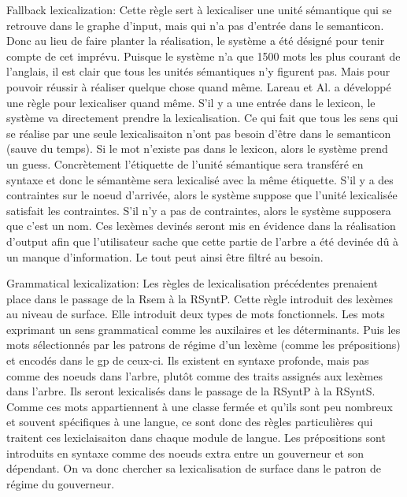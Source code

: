 Fallback lexicalization: Cette règle sert à lexicaliser une unité sémantique qui se retrouve dans le graphe d'input, mais qui n'a pas d'entrée dans le semanticon. Donc au lieu de faire planter la réalisation, le système a été désigné pour tenir compte de cet imprévu. Puisque le système n'a que 1500 mots les plus courant de l'anglais, il est clair que tous les unités sémantiques n'y figurent pas. Mais pour pouvoir réussir à réaliser quelque chose quand même. Lareau et Al. a développé une règle pour lexicaliser quand même. S'il y a une entrée dans le lexicon, le système va directement prendre la lexicalisation. Ce qui fait que tous les sens qui se réalise par une seule lexicalisaiton n'ont pas besoin d'être dans le semanticon (sauve du temps). Si le mot n'existe pas dans le lexicon, alors le système prend un guess. Concrètement l'étiquette de l'unité sémantique sera transféré en syntaxe et donc le sémantème sera lexicalisé avec la même étiquette. S'il y a des contraintes sur le noeud d'arrivée, alors le système suppose que l'unité lexicalisée satisfait les contraintes. S'il n'y a pas de contraintes, alors le système supposera que c'est un nom. Ces lexèmes devinés seront mis en évidence dans la réalisation d'output afin que l'utilisateur sache que cette partie de l'arbre a été devinée dû à un manque d'information. Le tout peut ainsi être filtré au besoin.
	
Grammatical lexicalization: Les règles de lexicalisation précédentes prenaient place dans le passage de la Rsem à la RSyntP. Cette règle introduit des lexèmes au niveau de surface. Elle introduit deux types de mots fonctionnels. Les mots exprimant un sens grammatical comme les auxilaires et les déterminants. Puis les mots sélectionnés par les patrons de régime d'un lexème (comme les prépositions) et encodés dans le gp de ceux-ci. Ils existent en syntaxe profonde, mais pas comme des noeuds dans l'arbre, plutôt comme des traits assignés aux lexèmes dans l'arbre. Ils seront lexicalisés dans le passage de la RSyntP à la RSyntS. Comme ces mots appartiennent à une classe fermée et qu'ils sont peu nombreux et souvent spécifiques à une langue, ce sont donc des règles particulières qui traitent ces lexiclaisaiton dans chaque module de langue. Les prépositions sont introduits en syntaxe comme des noeuds extra entre un gouverneur et son dépendant. On va donc chercher sa lexicalisation de surface dans le patron de régime du gouverneur. 



